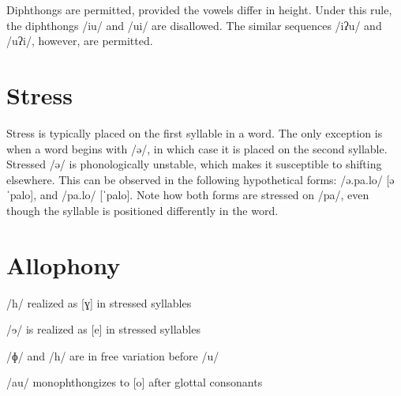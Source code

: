 Diphthongs are permitted, provided the vowels differ in height. Under this rule, the diphthongs /iu/ and /ui/ are disallowed. The similar sequences /iʔu/ and /uʔi/, however, are permitted.

\section{Stress}
Stress is typically placed on the first syllable in a word. The only exception is when a word begins with /ə/, in which case it is placed on the second syllable. Stressed /ə/ is phonologically unstable, which makes it susceptible to shifting elsewhere. This can be observed in the following hypothetical forms: /ə.pa.lo/ [əˈpalo], and /pa.lo/ [ˈpalo]. Note how both forms are stressed on /pa/, even though the syllable is positioned differently in the word.

\section{Allophony}


/h/ realized as [ɣ] in stressed syllables


/ɘ/ is realized as [e] in stressed syllables


/ɸ/ and /h/ are in free variation before /u/

/au/ monophthongizes to [o] after glottal consonants

